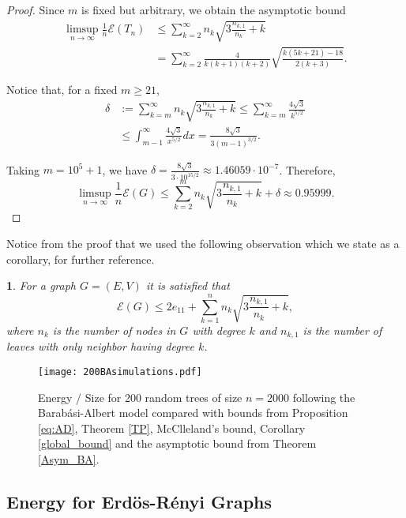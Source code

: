 \documentclass[a4paper]{article}
\newcommand{\energy}[1]{\mathcal{E}\left(#1\right)}
\theoremstyle{plain}
\newtheorem{corollary}{\protect\corname}
\renewcommand{\corname}{Corollary}
\renewcommand{\corname}{Corolario}
\begin{document}
\begin{proof}
Since \(m\) is fixed but arbitrary, we obtain the asymptotic bound
\begin{align*}
    \limsup_{n \to \infty} \frac{1}{n}\energy{T_n} &\leq \sum_{k = 2}^{\infty} n_k\sqrt{3\frac{n_{k,1}}{n_k} + k}\\
    &= \sum_{k = 2}^{\infty} \frac{4}{k(k+1)(k+2)} \sqrt{\frac{k(5k+21)-18}{2(k+3)}}.
\end{align*}

Notice that, for a fixed $m \geq 21$,
\begin{align*}
    \delta &:= \sum_{k = m}^{\infty} n_k \sqrt{3\frac{n_{k,1}}{n_k} + k}
    \leq \sum_{k = m}^{\infty} \frac{4\sqrt{3}}{k^{5/2}}\\
    &\leq \int_{m-1}^{\infty} \frac{4\sqrt{3}}{x^{5/2}}dx = \frac{8\sqrt{3}}{3(m-1)^{3/2}}.
\end{align*}

Taking $m = 10^5 + 1$, we have $\delta = \frac{8\sqrt{3}}{3\cdot 10^{15/2}} \approx 1.46059 \cdot 10^{-7}$. Therefore,
\[
    \limsup_{n \to \infty} \frac{1}{n}\energy{G} \leq \sum_{k = 2}^{m} n_k \sqrt{3\frac{n_{k,1}}{n_k} + k} + \delta \approx 0.95999.
\]
    
\end{proof}

Notice from the proof that we used the following observation which we state as a corollary, for further reference.

\begin{corollary}\label{cor-BA-model}
For a graph $G = (E,V)$ it is satisfied that
\[
    \energy{G} \leq 2e_{11} + \sum_{k = 1}^n n_k\sqrt{3\frac{n_{k,1}}{n_k} + k},
\]
where $n_k$ is the number of nodes in $G$ with degree $k$ and $n_{k,1}$ is the number of leaves with only neighbor having degree $k$.

\end{corollary}

\begin{figure}[H]
    \centering
    \texttt{[image: 200BAsimulations.pdf]}
    \caption{Energy / Size for 200 random trees of size \(n = 2000\) following the Barab\'asi-Albert model compared with bounds from Proposition \ref{eq:AD}, Theorem \ref{TP}, McClleland's bound, Corollary \ref{global_bound} and the asymptotic bound from Theorem \ref{Asym_BA}.}
\end{figure}

\subsection{Energy for Erd\"os-R\'enyi Graphs}
\label{ER}
\end{document}

